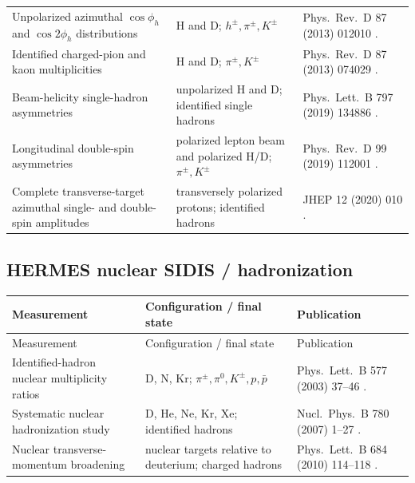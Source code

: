 \documentclass[11pt]{article}
\begin{document}
\begin{longtable}{@{}p{}p{}p{}@{}}
Unpolarized azimuthal $\cos\phi_h$ and $\cos 2\phi_h$ distributions &
H and D; $h^\pm,\pi^\pm,K^\pm$ &
Phys.\ Rev.\ D 87 (2013) 012010 \cite{HERMES:azimuth2013}. \\

Identified charged-pion and kaon multiplicities &
H and D; $\pi^\pm,K^\pm$ &
Phys.\ Rev.\ D 87 (2013) 074029 \cite{HERMES:multiplicity2013}. \\

Beam-helicity single-hadron asymmetries &
unpolarized H and D; identified single hadrons &
Phys.\ Lett.\ B 797 (2019) 134886 \cite{HERMES:beamhel2019}. \\

Longitudinal double-spin asymmetries &
polarized lepton beam and polarized H/D; $\pi^\pm,K^\pm$ &
Phys.\ Rev.\ D 99 (2019) 112001 \cite{HERMES:ALL2019}. \\

Complete transverse-target azimuthal single- and double-spin amplitudes &
transversely polarized protons; identified hadrons &
JHEP 12 (2020) 010 \cite{HERMES:fullTSA2020}. \\
\bottomrule
\end{longtable}
\normalsize

\subsection{HERMES nuclear SIDIS / hadronization}

\small
\begin{longtable}{@{}p{}p{}p{}@{}}
\toprule
Measurement & Configuration / final state & Publication \\ \midrule
\endfirsthead
\toprule
Measurement & Configuration / final state & Publication \\ \midrule
\endhead
Identified-hadron nuclear multiplicity ratios &
D, N, Kr; $\pi^\pm,\pi^0,K^\pm,p,\bar p$ &
Phys.\ Lett.\ B 577 (2003) 37--46 \cite{HERMES:nuclear2003}. \\

Systematic nuclear hadronization study &
D, He, Ne, Kr, Xe; identified hadrons &
Nucl.\ Phys.\ B 780 (2007) 1--27 \cite{HERMES:nuclear2007}. \\

Nuclear transverse-momentum broadening &
nuclear targets relative to deuterium; charged hadrons &
Phys.\ Lett.\ B 684 (2010) 114--118 \cite{HERMES:broadening2010}. \\
\bottomrule
\end{longtable}
\normalsize
\end{document}
